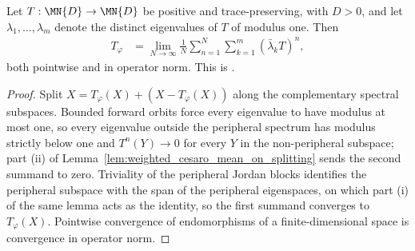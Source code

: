 \begin{theorem}
    \label{thm:peripheral_projection_weighted_cesaro}
    \leanok
    Let $T:\MN{D}\to\MN{D}$ be positive and trace-preserving, with $D>0$, and
    let $\lambda_{1},\dots,\lambda_{m}$ denote the distinct eigenvalues of
    $T$ of modulus one. Then
    \begin{align}
        T_\varphi
         & =\lim_{N\to\infty}\frac{1}{N}\sum_{n=1}^{N}
        \sum_{k=1}^{m}(\bar\lambda_{k}T)^{n},
        \label{eq:peripheral_projection_weighted_cesaro}
    \end{align}
    both pointwise and in operator norm. This is
    \cite[Equation~(6.15)]{Wolf2012Quantum}.
\end{theorem}

\begin{proof}\leanok
    Split $X=T_\varphi(X)+(X-T_\varphi(X))$ along the complementary spectral
    subspaces. Bounded forward orbits force every eigenvalue to have modulus
    at most one, so every eigenvalue outside the peripheral spectrum has
    modulus strictly below one and $T^{n}(Y)\to0$ for every $Y$ in the
    non-peripheral
    subspace; part (ii) of
    Lemma~\ref{lem:weighted_cesaro_mean_on_splitting} sends the second
    summand to zero. Triviality of the peripheral Jordan blocks identifies
    the peripheral subspace with the span of the peripheral eigenspaces, on
    which part (i) of the same lemma acts as the identity, so the first
    summand converges to $T_\varphi(X)$. Pointwise convergence of
    endomorphisms of a finite-dimensional space is convergence in operator
    norm.
\end{proof}
